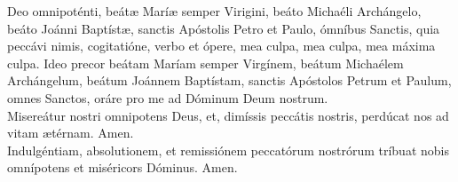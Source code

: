 Deo omnipoténti, beát{\ae} Marí{\ae} semper Virigini, beáto Michaéli Archángelo, beáto Joánni Baptíst{\ae}, sanctis 
Apóstolis Petro et Paulo, ómníbus Sanctis, quia peccávi nimis, cogitatióne, verbo et ópere, mea culpa, mea culpa, mea máxima culpa. Ideo precor beátam
Maríam semper Virgínem, beátum Michaélem Archángelum, beátum Joánnem Baptístam, sanctis Apóstolos Petrum et Paulum, omnes Sanctos,
oráre pro me ad Dóminum Deum nostrum.\\[2mm]
Misereátur nostri omnipotens Deus, et, dimíssis peccátis nostris, perdúcat nos ad vitam {\ae}térnam. Amen.\\[2mm]
Indulgéntiam, absolutionem, et remissiónem peccatórum nostrórum tríbuat nobis omnípotens et miséricors Dóminus. Amen.